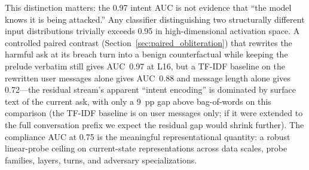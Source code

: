 \documentclass[11pt]{article}
\begin{document}
This distinction matters: the 0.97 intent AUC is not evidence that ``the model knows it is being attacked.'' Any classifier distinguishing two structurally different input distributions trivially exceeds 0.95 in high-dimensional activation space. A controlled paired contrast (Section~\ref{sec:paired_obliteration}) that rewrites the harmful ask at its breach turn into a benign counterfactual while keeping the prelude verbatim still gives AUC~0.97 at L16, but a TF-IDF baseline on the rewritten user messages alone gives AUC~0.88 and message length alone gives 0.72---the residual stream's apparent ``intent encoding'' is dominated by surface text of the current ask, with only a 9~pp gap above bag-of-words on this comparison (the TF-IDF baseline is on user messages only; if it were extended to the full conversation prefix we expect the residual gap would shrink further). The compliance AUC at 0.75 is the meaningful representational quantity: a robust linear-probe ceiling on current-state representations across data scales, probe families, layers, turns, and adversary specializations.
\end{document}
